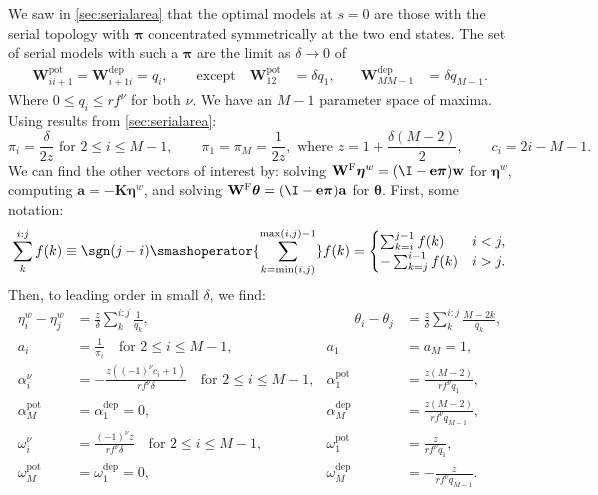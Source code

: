 \documentclass[12pt]{article}
\newcommand{\onev}{\mathbf{e}}
\newcommand{\eqm}{\pi}
\newcommand{\eq}{\boldsymbol{\eqm}}
\newcommand{\etwm}{\eta^w}
\newcommand{\etw}{\boldsymbol{\eta}^w}
\newcommand{\thbm}{\theta}
\newcommand{\thb}{\boldsymbol{\thbm}}
\newcommand{\wm}{w}
\newcommand{\w}{\mathbf{\wm}}
\newcommand{\Wm}{W}
\newcommand{\W}{\mathbf{\Wm}}
\newcommand{\encm}{K}
\newcommand{\enc}{\mathbf{\encm}}
\newcommand{\frg}{\W^{\mathrm{F}}}
\newcommand{\pot}{^{\text{pot}}}
\newcommand{\dep}{^{\text{dep}}}
\begin{document}
We saw in \cref{sec:serialarea} that the optimal models at \(s = 0\) are those with the serial topology with \(\eq\) concentrated symmetrically at the two end states.
The set of serial models with such a \(\eq\) are the limit as \(\delta \rightarrow 0\) of
%
\begin{equation}\label{eq:areamodels}
\begin{aligned}
  \W\pot_{ii+1} = \W\dep_{i+1i} = q_i, 
  \qquad
  \text{except} \quad
  \W\pot_{12} &= \delta q_1, \quad &
  \W\dep_{MM-1} &= \delta q_{M-1}.
\end{aligned}
\end{equation}
%
Where \(0 \leq q_i \leq rf^\nu\) for both \(\nu\).
We have an \(M-1\) parameter space of maxima.
Using results from \cref{sec:serialarea}:
%
\begin{equation*}
  \eqm_i = \frac{\delta}{2z} 
  \text{ for } 2 \leq i \leq M-1,
  \qquad
  \eqm_1 = \eqm_M = \frac{1}{2z},
  \text{ where } z = 1 + \frac{\delta (M-2)}{2},
  \qquad
  c_i = 2i - M - 1.
\end{equation*}
%
We can find the other vectors of interest by:
solving \(\frg \etw = (\I - \onev \eq) \w \) for \(\etw\),
computing \(\mathbf{a} = - \enc \etw\),
and solving \(\frg \thb = (\I - \onev \eq) \mathbf{a} \) for \(\thb\).
First, some notation:
%
\begin{equation*}
  \sum_k^{i:j} f(k) 
    \equiv \sgn(j-i) \smashoperator{\sum_{k = \min(i,j)}^{\max(i,j)-1}} f(k)
    = \begin{cases}
        \sum_{k=i}^{j-1} f(k) & i < j,\\
        - \sum_{k=j}^{i-1} f(k) & i > j.
      \end{cases}
\end{equation*}
%
Then, to leading order in small \(\delta\), we find:
%
\begin{equation}\label{eq:areavecs}
\begin{aligned}
  \etwm_i - \etwm_j &= \frac{z}{\delta} \sum_k^{i:j} \frac{1}{q_k}, & \qquad
  \thbm_i - \thbm_j &= \frac{z}{\delta} \sum_k^{i:j} \frac{M - 2k}{q_k}, \\
  a_i &= \frac{1}{\eqm_i} 
    \quad \text{for } 2 \leq i \leq M-1, &
  a_1 &= a_M = 1, \\
  \alpha^\nu_i &= - \frac{z ((-1)^\nu c_i + 1)}{r f^\nu \delta}
    \quad \text{for } 2 \leq i \leq M-1, &
  \alpha\pot_1 &= \frac{z(M-2)}{r f^\nu q_1}, \\
  \alpha\pot_M &= \alpha\dep_1 = 0, &
  \alpha\dep_M &= \frac{z(M-2)}{r f^\nu q_{M-1}}, \\
  \omega^\nu_i &= \frac{(-1)^\nu z}{r f^\nu \delta}
    \quad \text{for } 2 \leq i \leq M-1, &
  \omega\pot_1 &= \frac{z}{r f^\nu q_1}, \\
  \omega\pot_M &= \omega\dep_1 = 0, &
  \omega\dep_M &= - \frac{z}{r f^\nu q_{M-1}}.
\end{aligned}
\end{equation}
\end{document}
